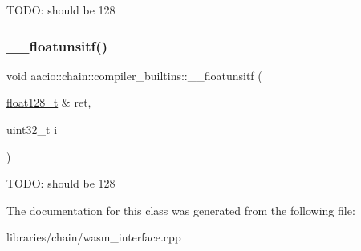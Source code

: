 T\+O\+DO\+: should be 128 \mbox{\label{classaacio_1_1chain_1_1compiler__builtins_a98d1e0686e643b8a94b108e0e1cdfaf6}} 
\subsubsection{\texorpdfstring{\+\_\+\+\_\+floatunsitf()}{\_\_floatunsitf()}}
{\footnotesize\ttfamily void aacio\+::chain\+::compiler\+\_\+builtins\+::\+\_\+\+\_\+floatunsitf (\begin{DoxyParamCaption}\item[{\mbox{\hyperlink{structfloat128__t}{float128\+\_\+t}} \&}]{ret,  }\item[{uint32\+\_\+t}]{i }\end{DoxyParamCaption})\hspace{0.3cm}{\ttfamily [inline]}}

T\+O\+DO\+: should be 128 

The documentation for this class was generated from the following file\+:\begin{DoxyCompactItemize}
\item 
libraries/chain/wasm\+\_\+interface.\+cpp\end{DoxyCompactItemize}
